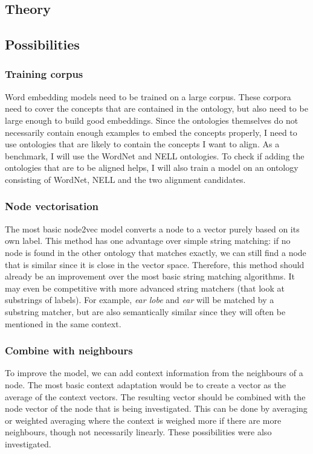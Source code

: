 \documentclass{article}
\begin{document}
 \subsection{Theory}
 \subsection{Possibilities} %
  \subsubsection{Training corpus}
  Word embedding models need to be trained on a large corpus. These corpora need to cover the concepts that are contained in the ontology, but also need to be large enough to build good embeddings. Since the ontologies themselves do not necessarily contain enough examples to embed the concepts properly, I need to use ontologies that are likely to contain the concepts I want to align.
  As a benchmark, I will use the WordNet and NELL ontologies. To check if adding the ontologies that are to be aligned helps, I will also train a model on an ontology consisting of WordNet, NELL and the two alignment candidates.
  \subsubsection{Node vectorisation}
  The most basic node2vec model converts a node to a vector purely based on its own label. This method has one advantage over simple string matching: if no node is found in the other ontology that matches exactly, we can still find a node that is similar since it is close in the vector space. Therefore, this method should already be an improvement over the most basic string matching algorithms. It may even be competitive with more advanced string matchers (that look at substrings of labels). For example, \emph{ear lobe} and \emph{ear} will be matched by a substring matcher, but are also semantically similar since they will often be mentioned in the same context.
  \subsubsection{Combine with neighbours}
  To improve the model, we can add context information from the neighbours of a node. The most basic context adaptation would be to create a vector as the average of the context vectors. The resulting vector should be combined with the node vector of the node that is being investigated. This can be done by averaging or weighted averaging where the context is weighed more if there are more neighbours, though not necessarily linearly. These possibilities were also investigated.
\end{document}
